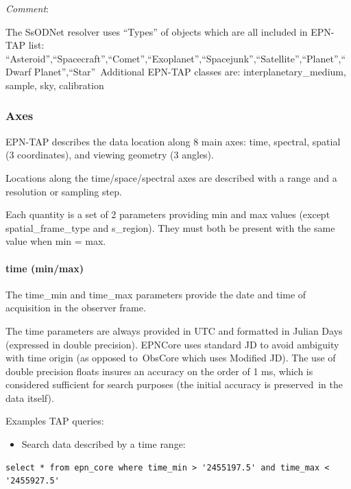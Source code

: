 \documentclass[11pt,a4paper]{ivoa}
\begin{document}
\emph{Comment}: 

The SsODNet resolver uses ``Types'' of objects which are all included in EPN-TAP list: ``Asteroid'',``Spacecraft'',``Comet'',``Exoplanet'',``Spacejunk'',``Satellite'',``Planet'',``Dwarf Planet'',``Star'' Additional EPN-TAP classes are: interplanetary\_medium, sample, sky, calibration \\

\subsubsection{Axes \\}

EPN-TAP describes the data location along 8 main axes: time, spectral, spatial (3 coordinates), and viewing geometry (3 angles). 

Locations along the time/space/spectral axes are described with a range and a resolution or sampling step. 

Each quantity is a set of 2 parameters providing min and max values (except spatial\_frame\_type and s\_region). They must both be present with the same value when min = max.

\paragraph{time (min/max)}

The time\_min and time\_max parameters provide the date and time of acquisition in the observer frame. 

The time parameters are always provided in UTC and formatted in Julian Days (expressed in double precision). EPNCore uses standard JD to avoid ambiguity with time origin (as opposed to ObsCore which uses Modified JD). The use of double precision floats insures an accuracy on the order of 1 ms, which is considered sufficient for search purposes (the initial accuracy is preserved in the data itself).

Examples TAP queries:

\begin{itemize}
\item Search data described by a time range:
\end{itemize}






\begin{verbatim}
select * from epn_core where time_min > '2455197.5' and time_max < '2455927.5'
\end{verbatim}
\end{document}
